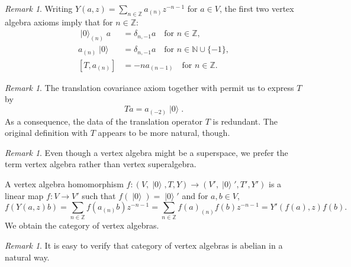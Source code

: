 \documentclass[a4paper, 12pt, reqno]{amsart}
\theoremstyle{remark}
\newtheorem{remark}[theorem]{Remark}
\numberwithin{equation}{subsection}
\DeclareMathOperator{\vac}{|0\rangle}
\begin{document}
\begin{remark}
  \label{rmk:7}
  Writing $Y(a, z) = \sum_{n \in \mathbb{Z}}a_{(n)}z^{-n - 1}$ for $a \in V$, the first two vertex algebra axioms imply that for $n \in \mathbb{Z}$:
  \begin{align*}
    \vac_{(n)}a &= \delta_{n, -1}a \quad \text{for } n \in \mathbb{Z},\\
    a_{(n)}\vac &= \delta_{n, -1}a \quad \text{for } n \in \mathbb{N}\cup\{-1\}, \\  
    [T, a_{(n)}] &= -na_{(n - 1)} \quad \text{for } n \in \mathbb{Z}.
  \end{align*}
\end{remark}

\begin{remark}
  \label{rmk:8}
  The translation covariance axiom together with  permit us to express $T$ by
  \begin{equation}
    \label{eq:15}
    Ta = a_{(-2)}\vac.
  \end{equation}
  As a consequence, the data of the translation operator $T$ is redundant.
  The original definition with $T$ appears to be more natural, though.
\end{remark}

\begin{remark}
  \label{rmk:9}
  Even though a vertex algebra might be a superspace, we prefer the term vertex algebra rather than vertex superalgebra.
\end{remark}

A vertex algebra homomorphism $f: (V, \vac, T, Y) \to (V', \vac', T', Y')$ is a linear map $f: V \to V'$ such that $f(\vac) = \vac'$ and for $a, b \in V$,
\begin{equation*}
  f(Y(a, z)b) = \sum_{n \in \mathbb{Z}}f(a_{(n)}b)z^{-n - 1} = \sum_{n \in \mathbb{Z}}f(a)_{(n)}f(b)z^{-n - 1} = Y'(f(a), z)f(b).
\end{equation*}
We obtain the category of vertex algebras.

\begin{remark}
  \label{rmk:10}
  It is easy to verify that category of vertex algebras is abelian in a natural way.
\end{remark}
\end{document}
